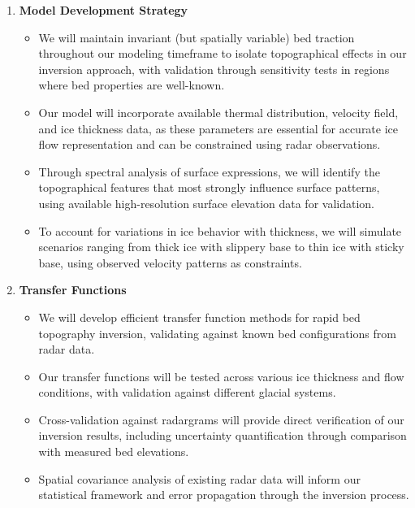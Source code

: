 \begin{enumerate}
\item\textbf{Model Development Strategy}
    \begin{itemize}
    \item We will maintain invariant (but spatially variable) bed traction throughout our modeling timeframe to isolate topographical effects in our inversion approach, with validation through sensitivity tests in regions where bed properties are well-known.
    
    \item Our model will incorporate available thermal distribution, velocity field, and ice thickness data, as these parameters are essential for accurate ice flow representation and can be constrained using radar observations.
    
    \item Through spectral analysis of surface expressions, we will identify the topographical features that most strongly influence surface patterns, using available high-resolution surface elevation data for validation.
    
    \item To account for variations in ice behavior with thickness, we will simulate scenarios ranging from thick ice with slippery base to thin ice with sticky base, using observed velocity patterns as constraints.
    \end{itemize}

\item\textbf{Transfer Functions}
    \begin{itemize}
    \item We will develop efficient transfer function methods for rapid bed topography inversion, validating against known bed configurations from radar data.
    
    \item Our transfer functions will be tested across various ice thickness and flow conditions, with validation against different glacial systems.
    
    \item Cross-validation against radargrams will provide direct verification of our inversion results, including uncertainty quantification through comparison with measured bed elevations.
    
    \item Spatial covariance analysis of existing radar data will inform our statistical framework and error propagation through the inversion process.
    

\end{itemize}
\end{enumerate}
